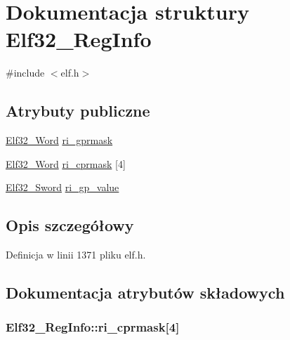 \hypertarget{struct_elf32___reg_info}{\section{Dokumentacja struktury Elf32\-\_\-\-Reg\-Info}
\label{struct_elf32___reg_info}
}


{\ttfamily \#include $<$elf.\-h$>$}

\subsection*{Atrybuty publiczne}
\begin{DoxyCompactItemize}
\item 
\hyperlink{elf_8h_af5924ece606c732e86f8263a19408e45}{Elf32\-\_\-\-Word} \hyperlink{struct_elf32___reg_info_a14e7256134e34950e4fb5681d77dd353}{ri\-\_\-gprmask}
\item 
\hyperlink{elf_8h_af5924ece606c732e86f8263a19408e45}{Elf32\-\_\-\-Word} \hyperlink{struct_elf32___reg_info_a42ab40af79e7bbfb3122546aa99824a8}{ri\-\_\-cprmask} \mbox{[}4\mbox{]}
\item 
\hyperlink{elf_8h_a30ce6352cf03c667272698ada477da95}{Elf32\-\_\-\-Sword} \hyperlink{struct_elf32___reg_info_ae464ec715b979270bedadc8889f94a16}{ri\-\_\-gp\-\_\-value}
\end{DoxyCompactItemize}


\subsection{Opis szczegółowy}


Definicja w linii 1371 pliku elf.\-h.



\subsection{Dokumentacja atrybutów składowych}
\hypertarget{struct_elf32___reg_info_a42ab40af79e7bbfb3122546aa99824a8}{
\subsubsection[{ri\-\_\-cprmask}]{ Elf32\-\_\-\-Reg\-Info\-::ri\-\_\-cprmask\mbox{[}4\mbox{]}}}\label{struct_elf32___reg_info_a42ab40af79e7bbfb3122546aa99824a8}


